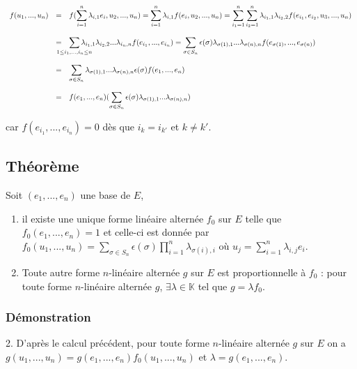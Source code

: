 \documentclass[a4paper,10pt]{book} %
\newcommand{\K}{\mathbb{K}}
\newcommand{\displayAmath}{\displaystyle}
\begin{document}
$\displayAmath \begin{array}{rcl}
f(u_1,...,u_n)
&=&\displayAmath f(\sum_{i=1}^n\lambda_{i,1}e_i,u_2,...,u_n)=\sum_{i=1}^n\lambda_{i,1}f(e_{i},u_2,...,u_n)=\sum_{i_1=1}^n\sum_{i_2=1}^n\lambda_{i_1,1}\lambda_{i_2,2}f(e_{i_1},e_{i_2},u_3,...,u_n)\\\\
&=&\displayAmath \sum_{\mathclap{1\leq i_1,...,i_n\leq n}} \lambda_{i_1,1}\lambda_{i_2,2}...\lambda_{i_n,n}f(e_{i_1},...,e_{i_n})= \sum_{\sigma\in S_n}\epsilon(\sigma)\lambda_{\sigma(1),1}...\lambda_{\sigma(n),n} f(e_{\sigma(1)},...,e_{\sigma(n)})\\\\
&=& \displayAmath\sum_{\sigma\in S_n}\lambda_{\sigma(1),1} ... \lambda_{\sigma(n),n}\epsilon(\sigma)f(e_1,...,e_n)\\\\
&=& \displayAmath f(e_1,...,e_n)(\sum_{\sigma\in S_n} \epsilon(\sigma)\lambda_{\sigma(1),1}...\lambda_{\sigma(n),n})
\end{array}$

car $f(e_{i_1},...,e_{i_n})=0$ dès que $i_k=i_{k'}$ et $k\neq k'$.

\subsection{Théorème}
Soit $(e_1,...,e_n)$ une base de $E$, 
\begin{enumerate}
\item  il existe une unique forme linéaire alternée $f_0$ sur $E$ telle que $f_0(e_1,...,e_n)=1$ et celle-ci est donnée par $\displayAmath f_0(u_1,...,u_n)=\sum_{\sigma\in S_n}\epsilon(\sigma)\prod_{i=1}^n\lambda_{\sigma(i),i}$ où $\displayAmath u_j=\sum_{i=1}^n\lambda_{i,j}e_i$.

\item Toute autre forme $n$-linéaire alternée $g$ sur $E$ est proportionnelle à $f_0$ : pour toute forme $n$-linéaire alternée $g$, $\exists \lambda\in \K$ tel que $g=\lambda f_0$.
\end{enumerate}

\subsubsection{Démonstration}
2. D'après le calcul précédent, pour toute forme $n$-linéaire alternée $g$ sur $E$ on a\\
$g(u_1,...,u_n)=g(e_1,...,e_n)f_0(u_1,...,u_n)$ et $\lambda=g(e_1,...,e_n)$.
\end{document}
